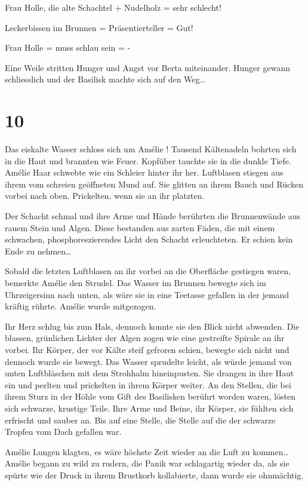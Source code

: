 \documentclass[11pt,titlepage,a5paper]{book}
\newcommand{\am}{Amélie }
\begin{document}
Frau Holle, die alte Schachtel + Nudelholz = sehr schlecht!

Leckerbissen im Brunnen = Präsentierteller = Gut! 

Frau Holle = muss schlau sein = -

Eine Weile stritten Hunger und Angst vor Berta miteinander. Hunger gewann schliesslich und der Basilisk machte sich auf den Weg\dots

\section*{10}

Das eiskalte Wasser schloss sich um \am ! Tausend Kältenadeln bohrten sich in die Haut und brannten wie Feuer. Kopfüber tauchte sie in die dunkle Tiefe. \am Haar schwebte wie ein Schleier hinter ihr her. Luftblasen stiegen aus ihrem vom schreien geöffneten Mund auf. Sie glitten an ihrem Bauch und Rücken vorbei nach oben. Prickelten, wenn sie an ihr platzten. 

Der Schacht schmal und ihre Arme und Hände berührten die Brunnenwände aus rauem Stein und Algen. Diese bestanden aus zarten Fäden, die mit einem schwachen, phosphoreszierendes  Licht den Schacht erleuchteten. Er schien kein Ende zu nehmen\dots

Sobald die letzten Luftblasen an ihr vorbei an die Oberfläche gestiegen waren, bemerkte \am den Strudel. Das Wasser im Brunnen bewegte sich im Uhrzeigersinn nach unten, als wäre sie in eine Teetasse gefallen in der jemand kräftig rührte. \am wurde mitgezogen.

Ihr Herz schlug bis zum Hals, dennoch konnte sie den Blick nicht abwenden. Die blassen, grünlichen Lichter der Algen zogen wie eine gestreifte Spirale an ihr vorbei. Ihr Körper, der vor Kälte steif gefroren schien, bewegte sich nicht und dennoch wurde sie bewegt. Das Wasser sprudelte leicht, als würde jemand von unten Luftbläschen mit dem Strohhalm hineinpusten. Sie drangen in ihre Haut ein und perlten und prickelten in ihrem Körper weiter. An den Stellen, die bei ihrem Sturz in der Höhle vom Gift des Basilisken berührt worden waren, lösten sich schwarze, krustige Teile. Ihre Arme und Beine, ihr Körper, sie fühlten sich erfrischt und sauber an. Bis auf eine Stelle, die Stelle auf die der schwarze Tropfen vom Dach gefallen war.

\am Lungen klagten, es wäre höchste Zeit wieder an die Luft zu kommen\dots \am begann zu wild zu rudern, die Panik war schlagartig wieder da, als sie spürte wie der Druck in ihrem Brustkorb kollabierte, dann wurde sie ohnmächtig. 
\end{document}
